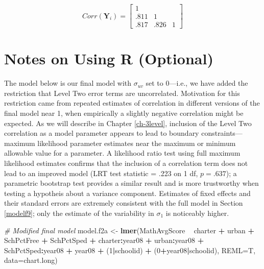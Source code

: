 \documentclass[
]{krantz}
\newenvironment{Shaded}{\begin{snugshade}}{\end{snugshade}}
\newcommand{\CommentTok}[1]{\textcolor[rgb]{0.37,0.37,0.37}{\textit{#1}}}
\newcommand{\DataTypeTok}[1]{\textcolor[rgb]{0.27,0.27,0.27}{#1}}
\newcommand{\DecValTok}[1]{\textcolor[rgb]{0.06,0.06,0.06}{#1}}
\newcommand{\KeywordTok}[1]{\textcolor[rgb]{0.27,0.27,0.27}{\textbf{#1}}}
\newcommand{\NormalTok}[1]{#1}
\newcommand{\OperatorTok}[1]{\textcolor[rgb]{0.43,0.43,0.43}{\textbf{#1}}}
\newcommand{\StringTok}[1]{\textcolor[rgb]{0.5,0.5,0.5}{#1}}
\begin{document}
\[ Corr(\mathbf{Y}_i) =  \left[
          \begin{array}{cccc}
            1 & &   \\
            .811 & 1 &  \\
            .817 & .826 & 1
          \end{array} \right] \]

\hypertarget{notesr9}{%
\section{Notes on Using R (Optional)}\label{notesr9}}

The model below is our final model with \(\sigma_{uv}\) set to 0---i.e., we have added the restriction that Level Two error terms are uncorrelated. Motivation for this restriction came from repeated estimates of correlation in different versions of the final model near 1, when empirically a slightly negative correlation might be expected. As we will describe in Chapter \ref{ch-3level}, inclusion of the Level Two correlation as a model parameter appears to lead to boundary constraints---maximum likelihood parameter estimates near the maximum or minimum allowable value for a parameter. A likelihood ratio test using full maximum likelihood estimates confirms that the inclusion of a correlation term does not lead to an improved model (LRT test statistic = .223 on 1 df, \(p=.637\)); a parametric bootstrap test provides a similar result and is more trustworthy when testing a hypotheis about a variance component. Estimates of fixed effects and their standard errors are extremely consistent with the full model in Section \ref{modelf9}; only the estimate of the variability in \(\sigma_{1}\) is noticeably higher.

\begin{Shaded}
\begin{Highlighting}[]
\CommentTok{# Modified final model}
\NormalTok{model.f2a <-}\StringTok{ }\KeywordTok{lmer}\NormalTok{(MathAvgScore }\OperatorTok{~}\StringTok{ }\NormalTok{charter }\OperatorTok{+}\StringTok{ }\NormalTok{urban }\OperatorTok{+}\StringTok{ }\NormalTok{SchPctFree }\OperatorTok{+}
\StringTok{  }\NormalTok{SchPctSped }\OperatorTok{+}\StringTok{ }\NormalTok{charter}\OperatorTok{:}\NormalTok{year08 }\OperatorTok{+}\StringTok{ }\NormalTok{urban}\OperatorTok{:}\NormalTok{year08 }\OperatorTok{+}
\StringTok{  }\NormalTok{SchPctSped}\OperatorTok{:}\NormalTok{year08 }\OperatorTok{+}\StringTok{ }\NormalTok{year08 }\OperatorTok{+}
\StringTok{  }\NormalTok{(}\DecValTok{1}\OperatorTok{|}\NormalTok{schoolid) }\OperatorTok{+}\StringTok{ }\NormalTok{(}\DecValTok{0}\OperatorTok{+}\NormalTok{year08}\OperatorTok{|}\NormalTok{schoolid), }\DataTypeTok{REML=}\NormalTok{T, }\DataTypeTok{data=}\NormalTok{chart.long)}
\end{Highlighting}
\end{Shaded}
\end{document}
